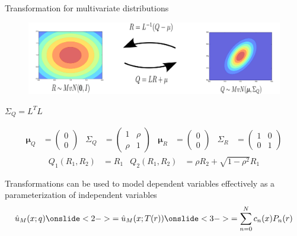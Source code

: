 \documentclass[handout]{beamer}
\begin{document}
\begin{frame}{Transformation for multivariate distributions}{}
\begin{figure}
 \includegraphics[width=\textwidth]{trans1.png}
\end{figure}
    \begin{flushright}
        $\Sigma_Q = L^TL$
    \end{flushright}
    \scriptsize
\pause
    \begin{align*}
        \bm\mu_Q &=
        \begin{pmatrix}
            0 \\ 0
        \end{pmatrix} &
        \Sigma_Q &=
        \begin{pmatrix}
            1 & \rho \\ \rho & 1
        \end{pmatrix} &
        \bm\mu_R &=
        \begin{pmatrix}
            0 \\ 0
        \end{pmatrix} &
        \Sigma_R &=
        \begin{pmatrix}
            1 & 0 \\ 0 & 1
        \end{pmatrix}
    \end{align*}
    \pause
    \normalsize
    \begin{align*}
        Q_1(R_1, R_2) &= R_1 &
        Q_2(R_1, R_2) &= \rho R_2 + \sqrt{1-\rho^2} R_1
    \end{align*}
\end{frame}

\begin{frame}{Transformations can be used to model dependent
    variables effectively as a parameterization of independent
    variables}{}
    \begin{align*}
        \hat u_M(x; q)
        \onslide<2->{= \hat u_M(x; T(r))}
        \onslide<3->{= \sum_{n=0}^N c_n(x) P_n(r)}
    \end{align*}
\end{frame}
\end{document}

